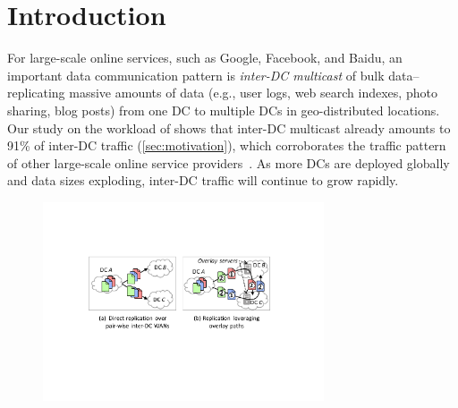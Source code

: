 \section{Introduction}

For large-scale online services, such as Google, Facebook, and
Baidu, an important data communication pattern is {\em inter-DC 
multicast} of bulk data--replicating massive amounts of data (e.g., 
user logs, web search indexes, photo sharing, blog posts) 
from one DC to multiple DCs in geo-distributed locations.
Our study on the workload of \company shows that inter-DC multicast
already amounts to 91\% of inter-DC traffic (\Section\ref{sec:motivation}), 
which corroborates the traffic pattern of other large-scale online 
service providers~\cite{kumar2015bwe,zhang2016piebridge}.
As more DCs are deployed globally and data sizes exploding, 
inter-DC traffic will continue to grow rapidly. 




\begin{figure}[t!]
\includegraphics[width=83mm]{images/intro-example-3.pdf}
\vspace{-0.4cm}
\label{fig:intro}
\vspace{-0.4cm}
\end{figure}

